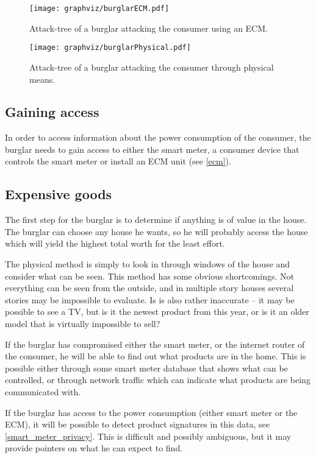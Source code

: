 \begin{figure}
\center
\texttt{[image: graphviz/burglarECM.pdf]}
\caption{Attack-tree of a burglar attacking the consumer using an ECM.}
\label{attacktree:burglar:ecm}
\end{figure}

\begin{figure}
\center
\texttt{[image: graphviz/burglarPhysical.pdf]}
\caption{Attack-tree of a burglar attacking the consumer through physical means.}
\label{attacktree:burglar:physical}
\end{figure}

\subsection{Gaining access}
In order to access information about the power consumption of the consumer, the burglar needs to gain access to either the smart meter, a consumer device that controls the smart meter or install an ECM unit (see \cref{ecm}).

\subsection{Expensive goods}
The first step for the burglar is to determine if anything is of value in the house. 
The burglar can choose any house he wants, so he will probably access the house which will yield the highest total worth for the least effort.

The physical method is simply to look in through windows of the house and consider what can be seen. 
This method has some obvious shortcomings.
Not everything can be seen from the outside, and in multiple story houses several stories may be impossible to evaluate.
Is is also rather inaccurate -- it may be possible to see a TV, but is it the newest product from this year, or is it an older model that is virtually impossible to sell?

If the burglar has compromised either the smart meter, or the internet router of the consumer, he will be able to find out what products are in the home. 
This is possible either through some smart meter database that shows what can be controlled, or through network traffic which can indicate what products are being communicated with.

If the burglar has access to the power consumption (either smart meter or the ECM), it will be possible to detect product signatures in this data, see \cref{smart_meter_privacy}.
This is difficult and possibly ambiguous, but it may provide pointers on what he can expect to find.

